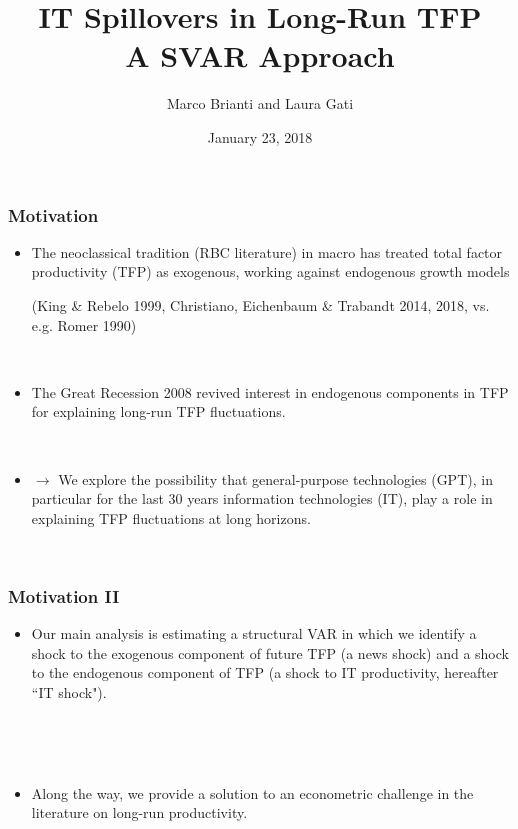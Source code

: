 \documentclass{beamer}
\author[Brianti, Gati]{Marco Brianti and Laura Gati}
\institute[Boston College]{Boston College}
\title{IT Spillovers in Long-Run TFP \\ A SVAR Approach}
\date{January 23, 2018}
\begin{document}
\begin{frame}

\maketitle


\end{frame}


\begin{frame}
	\frametitle{Motivation}
	
	\begin{itemize}
	\item The neoclassical tradition (RBC literature) in macro has treated total factor productivity (TFP) as exogenous, working against endogenous growth models 
	
	(King \& Rebelo 1999, Christiano, Eichenbaum \& Trabandt 2014, 2018, vs. e.g. Romer 1990)
	
	\
	
	\item The Great Recession 2008 revived interest in endogenous components in TFP for explaining long-run TFP fluctuations.
	
	\
	
	\item[] $\rightarrow$ We explore the possibility that general-purpose technologies (GPT), in particular for the last 30 years information technologies (IT), play a role in explaining TFP fluctuations at long horizons. 
	
	\
	
	\end{itemize} 

\end{frame}

\begin{frame}
	\frametitle{Motivation II}
	
	\begin{itemize}
	\item Our main analysis is estimating a structural VAR in which we identify a shock to the exogenous component of future TFP (a news shock) and a shock to the endogenous component of TFP (a shock to IT productivity, hereafter ``IT shock").
	
	
	\
	
	\
	
	\item Along the way, we provide a solution to an econometric challenge in the literature on long-run productivity. 
	
	\end{itemize} 

\end{frame}
\end{document}

